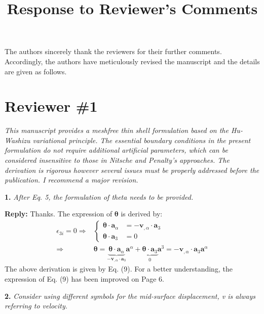 \documentclass{article}
\title{Response to Reviewer's Comments}
\author{}
\date{}
\begin{document}
\maketitle

The authors sincerely thank the reviewers for their further comments. Accordingly, the authors have meticulously revised the manuscript and the details are given as follows.

\section*{Reviewer \#1}
\textit{This manuscript provides a meshfree thin shell formulation based on the Hu-Washizu variational principle. The essential boundary conditions in the present formulation do not require additional artificial parameters, which can be considered insensitive to those in Nitsche and Penalty’s approaches. The derivation is rigorous however several issues must be properly addressed before the publication. I recommend a major revision.}

\textbf{1.} \textit{After Eq. 5, the formulation of theta needs to be provided.}

\textbf{Reply:} Thanks. The expression of $\boldsymbol \theta$ is derived by:
\begin{equation}
    \begin{split}
        \epsilon_{3i} = 0 \Rightarrow &
        \left \{
        \begin{split}
            \boldsymbol \theta \cdot \boldsymbol a_\alpha &= - \boldsymbol v_{,\alpha} \cdot \boldsymbol a_3 \\
            \boldsymbol \theta \cdot \boldsymbol a_3 &= 0
        \end{split}
        \right . \\ \Rightarrow &
        \boldsymbol \theta = \underbrace{\boldsymbol \theta \cdot \boldsymbol a_{\alpha}}_{- \boldsymbol v_{,\alpha} \cdot \boldsymbol a_3} \boldsymbol a^\alpha 
        + \underbrace{\boldsymbol \theta \cdot \boldsymbol a_3}_{0} \boldsymbol a^3 = - \boldsymbol v_{,\alpha} \cdot \boldsymbol a_3 \boldsymbol a^\alpha
    \end{split}
\end{equation}
The above derivation is given by Eq. (9). For a better understanding, the expression of Eq. (9) has been improved on Page 6.

\textbf{2.} \textit{Consider using different symbols for the mid-surface displacement, v is always referring to velocity.}
\end{document}
